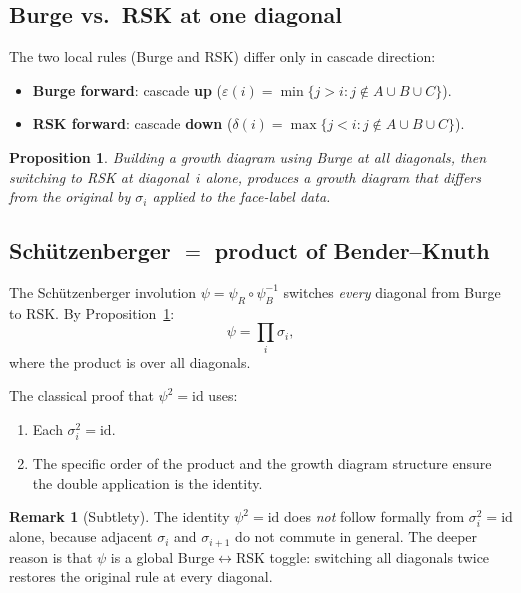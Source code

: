 \documentclass[11pt]{article}
\theoremstyle{plain}
\newtheorem{proposition}[theorem]{Proposition}
\theoremstyle{definition}
\newtheorem{remark}[theorem]{Remark}
\begin{document}
\subsection{Burge vs.\ RSK at one diagonal}

The two local rules (Burge and RSK) differ only in cascade
direction:
\begin{itemize}
  \item \textbf{Burge forward}: cascade \textbf{up}
    ($\varepsilon(i) = \min\{j > i : j \notin
    A \cup B \cup C\}$).
  \item \textbf{RSK forward}: cascade \textbf{down}
    ($\delta(i) = \max\{j < i : j \notin
    A \cup B \cup C\}$).
\end{itemize}

\begin{proposition}
\label{prop:switch-one-diagonal}
Building a growth diagram using Burge at all diagonals, then
switching to RSK at diagonal~$i$ alone, produces a growth
diagram that differs from the original by $\sigma_i$ applied
to the face-label data.
\end{proposition}


\subsection{Sch\"utzenberger $=$ product of Bender--Knuth}

The Sch\"utzenberger involution
$\psi = \psi_R \circ \psi_B^{-1}$ switches \emph{every}
diagonal from Burge to RSK\@.  By
Proposition~\ref{prop:switch-one-diagonal}:
\begin{equation}\label{eq:psi-decomp}
  \psi = \prod_{i} \sigma_i,
\end{equation}
where the product is over all diagonals.

The classical proof that $\psi^2 = \mathrm{id}$ uses:
\begin{enumerate}
  \item Each $\sigma_i^2 = \mathrm{id}$.
  \item The specific order of the product and the growth
    diagram structure ensure the double application is
    the identity.
\end{enumerate}

\begin{remark}[Subtlety]
\label{rem:subtlety}
The identity $\psi^2 = \mathrm{id}$ does \emph{not} follow
formally from $\sigma_i^2 = \mathrm{id}$ alone, because
adjacent $\sigma_i$ and $\sigma_{i+1}$ do not commute in
general.  The deeper reason is that $\psi$ is a global
Burge$\leftrightarrow$RSK toggle: switching all diagonals
twice restores the original rule at every diagonal.
\end{remark}
\end{document}
